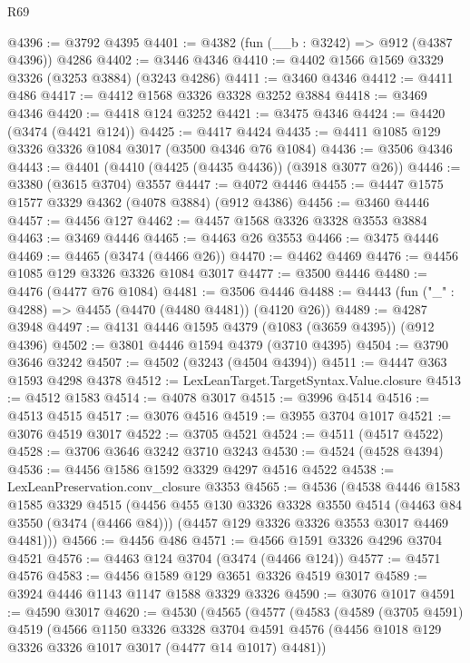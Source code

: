 \begin{lexlean}{R69}
\begin{coremodule}
@4396 := @3792 @4395
@4401 := @4382 (fun (__b : @3242) => @912 (@4387 @4396)) @4286
@4402 := @3446 @4346
@4410 := @4402 @1566 @1569 @3329 @3326 (@3253 @3884) (@3243 @4286)
@4411 := @3460 @4346
@4412 := @4411 @486
@4417 := @4412 @1568 @3326 @3328 @3252 @3884
@4418 := @3469 @4346
@4420 := @4418 @124 @3252
@4421 := @3475 @4346
@4424 := @4420 (@3474 (@4421 @124))
@4425 := @4417 @4424
@4435 := @4411 @1085 @129 @3326 @3326 @1084 @3017 (@3500 @4346 @76 @1084)
@4436 := @3506 @4346
@4443 := @4401 (@4410 (@4425 (@4435 @4436)) (@3918 @3077 @26))
@4446 := @3380 (@3615 @3704) @3557
@4447 := @4072 @4446
@4455 := @4447 @1575 @1577 @3329 @4362 (@4078 @3884) (@912 @4386)
@4456 := @3460 @4446
@4457 := @4456 @127
@4462 := @4457 @1568 @3326 @3328 @3553 @3884
@4463 := @3469 @4446
@4465 := @4463 @26 @3553
@4466 := @3475 @4446
@4469 := @4465 (@3474 (@4466 @26))
@4470 := @4462 @4469
@4476 := @4456 @1085 @129 @3326 @3326 @1084 @3017
@4477 := @3500 @4446
@4480 := @4476 (@4477 @76 @1084)
@4481 := @3506 @4446
@4488 := @4443 (fun ("_" : @4288) => @4455 (@4470 (@4480 @4481)) (@4120 @26))
@4489 := @4287 @3948
@4497 := @4131 @4446 @1595 @4379 (@1083 (@3659 @4395)) (@912 @4396)
@4502 := @3801 @4446 @1594 @4379 (@3710 @4395)
@4504 := @3790 @3646 @3242
@4507 := @4502 (@3243 (@4504 @4394))
@4511 := @4447 @363 @1593 @4298 @4378
@4512 := LexLeanTarget.TargetSyntax.Value.closure
@4513 := @4512 @1583
@4514 := @4078 @3017
@4515 := @3996 @4514
@4516 := @4513 @4515
@4517 := @3076 @4516
@4519 := @3955 @3704 @1017
@4521 := @3076 @4519 @3017
@4522 := @3705 @4521
@4524 := @4511 (@4517 @4522)
@4528 := @3706 @3646 @3242 @3710 @3243
@4530 := @4524 (@4528 @4394)
@4536 := @4456 @1586 @1592 @3329 @4297 @4516 @4522
@4538 := LexLeanPreservation.conv_closure @3353
@4565 := @4536
    (@4538
      @4446
      @1583
      @1585
      @3329
      @4515
      (@4456
        @455
        @130
        @3326
        @3328
        @3550
        @4514
        (@4463 @84 @3550 (@3474 (@4466 @84)))
        (@4457 @129 @3326 @3326 @3553 @3017 @4469 @4481)))
@4566 := @4456 @486
@4571 := @4566 @1591 @3326 @4296 @3704 @4521
@4576 := @4463 @124 @3704 (@3474 (@4466 @124))
@4577 := @4571 @4576
@4583 := @4456 @1589 @129 @3651 @3326 @4519 @3017
@4589 := @3924 @4446 @1143 @1147 @1588 @3329 @3326
@4590 := @3076 @1017
@4591 := @4590 @3017
@4620 := @4530
    (@4565
      (@4577
        (@4583
          (@4589
            (@3705 @4591)
            @4519
            (@4566
              @1150
              @3326
              @3328
              @3704
              @4591
              @4576
              (@4456 @1018 @129 @3326 @3326 @1017 @3017 (@4477 @14 @1017) @4481))

\end{coremodule}
\end{lexlean}
